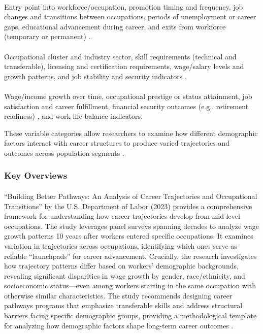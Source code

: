 \documentclass[../main.tex]{subfiles}
\begin{document}
\paragraph{} Entry point into workforce/occupation, promotion timing and frequency, job changes and transitions between occupations, periods of unemployment or career gaps, educational advancement during career, and exits from workforce (temporary or permanent) \citep{nataraj2018career}.

\paragraph{} Occupational cluster and industry sector, skill requirements (technical and transferable), licensing and certification requirements, wage/salary levels and growth patterns, and job stability and security indicators \citep{dol2023building}.

\paragraph{} Wage/income growth over time, occupational prestige or status attainment, job satisfaction and career fulfillment, financial security outcomes (e.g., retirement readiness) \citep{lee2023middle}, and work-life balance indicators.

These variable categories allow researchers to examine how different demographic factors interact with career structures to produce varied trajectories and outcomes across population segments \citep{questionpro2024demographic}.

\subsubsection{Key Overviews}

\paragraph{} ``Building Better Pathways: An Analysis of Career Trajectories and Occupational Transitions'' by the U.S. Department of Labor (2023) provides a comprehensive framework for understanding how career trajectories develop from mid-level occupations. The study leverages panel surveys spanning decades to analyze wage growth patterns 10 years after workers entered specific occupations. It examines variation in trajectories across occupations, identifying which ones serve as reliable ``launchpads'' for career advancement. Crucially, the research investigates how trajectory patterns differ based on workers' demographic backgrounds, revealing significant disparities in wage growth by gender, race/ethnicity, and socioeconomic status—even among workers starting in the same occupation with otherwise similar characteristics. The study recommends designing career pathways programs that emphasize transferable skills and address structural barriers facing specific demographic groups, providing a methodological template for analyzing how demographic factors shape long-term career outcomes \citep{dol2023building}.
\end{document}
